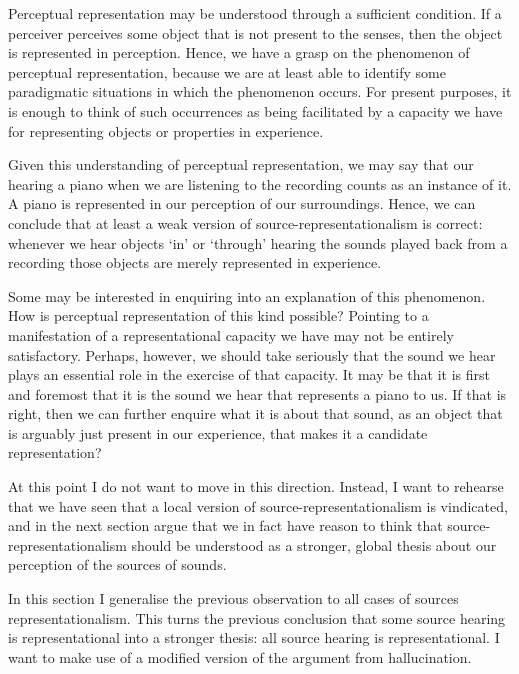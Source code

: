 \documentclass[sloppy, journal, git, bytitle, dodraft]{humapap}
\begin{document}
\sect Perceptual representation may be understood through a sufficient condition. If a perceiver perceives some object that is not present to the senses, then the object is represented in perception. Hence, we have a grasp on the phenomenon of perceptual representation, because we are at least able to identify some paradigmatic situations in which the phenomenon occurs. For present purposes, it is enough to think of such occurrences as being facilitated by a capacity we have for representing objects or properties in experience. 

Given this understanding of perceptual representation, we may say that our hearing a piano when we are listening to the recording counts as an instance of it. A piano is represented in our perception of our surroundings. Hence, we can conclude that at least a weak version of source-representationalism is correct: whenever we hear objects `in' or `through' hearing the sounds played back from a recording those objects are merely represented in experience. 

Some may be interested in enquiring into an explanation of this phenomenon. How is perceptual representation of this kind possible? Pointing to a manifestation of a representational capacity we have may not be entirely satisfactory. Perhaps, however, we should take seriously that the sound we hear plays an essential role in the exercise of that capacity. It may be that it is first and foremost that it is the sound we hear that represents a piano to us. If that is right, then we can further enquire what it is about that sound, as an object that is arguably just present in our experience, that makes it a candidate representation? 

At this point I do not want to move in this direction. Instead, I want to rehearse that we have seen that a local version of source-representationalism is vindicated, and in the next section argue that we in fact have reason to think that source-representationalism should be understood as a stronger, global thesis about our perception of the sources of sounds. 


\sect In this section I generalise the previous observation to all cases of sources representationalism. This turns the previous conclusion that some source hearing is representational into a stronger thesis: all source hearing is representational. I want to make use of a modified version of the argument from hallucination. 
\end{document}
